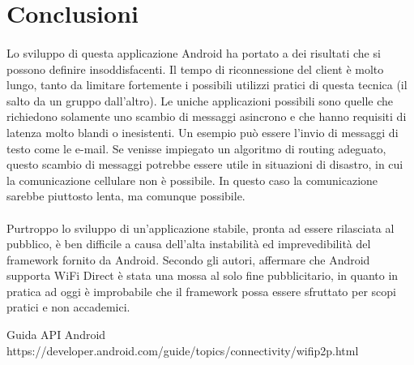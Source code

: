 \documentclass{llncs}
\begin{document}
\section{Conclusioni}
\paragraph{} Lo sviluppo di questa applicazione Android ha portato a dei risultati che si possono definire insoddisfacenti. Il tempo di riconnessione del client è molto lungo, tanto da limitare fortemente i possibili utilizzi pratici di questa tecnica
(il salto da un gruppo dall'altro). Le uniche applicazioni possibili sono quelle che richiedono solamente uno scambio di messaggi asincrono e che hanno requisiti di latenza molto blandi o inesistenti. Un esempio può essere l'invio di messaggi di testo come le e-mail. Se venisse impiegato un algoritmo di routing adeguato, questo scambio di messaggi potrebbe essere utile in situazioni di disastro, in cui la comunicazione cellulare non è possibile. In questo caso la comunicazione sarebbe piuttosto lenta, ma comunque possibile.
\paragraph{} Purtroppo lo sviluppo di un'applicazione stabile, pronta ad essere rilasciata al pubblico, è ben difficile a causa dell'alta instabilità ed imprevedibilità del framework fornito da Android. Secondo gli autori, affermare che Android supporta WiFi Direct è stata una mossa al solo fine pubblicitario, in quanto in pratica ad oggi è improbabile che il framework possa essere sfruttato per scopi pratici e non accademici.


\begin{thebibliography}{}
	 Guida API Android https://developer.android.com/guide/topics/connectivity/wifip2p.html
\end{thebibliography}
\end{document}
